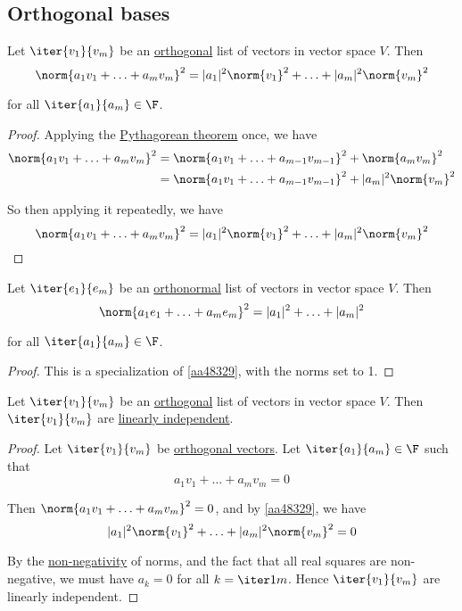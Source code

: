 \subsection{Orthogonal bases}\label{b926854}

\label{aa48329}

Let $\iter{v_1}{v_m}$ be an \href{d9735e5}{orthogonal} list of vectors in
vector space $V$. Then
$$
  \norm{a_1v_1+\ldots+a_mv_m}^2=|a_1|^2\norm{v_1}^2+\ldots+|a_m|^2\norm{v_m}^2
$$

for all $\iter{a_1}{a_m}\in\F$.

\begin{proof}
  Applying the \href{c5e5d7d}{Pythagorean theorem} once, we have
  \begin{align*}
    \norm{a_1v_1+\ldots+a_mv_m}^2 &=\norm{a_1v_1+\ldots+a_{m-1}v_{m-1}}^2+\norm{a_mv_m}^2     \\
                                  &=\norm{a_1v_1+\ldots+a_{m-1}v_{m-1}}^2+|a_m|^2\norm{v_m}^2
  \end{align*}

  So then applying it repeatedly, we have
  $$
    \norm{a_1v_1+\ldots+a_mv_m}^2=|a_1|^2\norm{v_1}^2+\ldots+|a_m|^2\norm{v_m}^2
  $$
\end{proof}

\label{a3a166f}

Let $\iter{e_1}{e_m}$ be an \href{d90fcb1}{orthonormal} list of vectors in
vector space $V$. Then
$$
  \norm{a_1e_1+\ldots+a_me_m}^2=|a_1|^2+\ldots+|a_m|^2
$$

for all $\iter{a_1}{a_m}\in\F$.

\begin{proof}
  This is a specialization of \autoref{aa48329}, with the norms set to 1.
\end{proof}

\label{c0eb6f5}

Let $\iter{v_1}{v_m}$ be an \href{d9735e5}{orthogonal} list of vectors in
vector space $V$. Then $\iter{v_1}{v_m}$ are \href{c133a44}{linearly
independent}.

\begin{proof}
  Let $\iter{v_1}{v_m}$ be \href{d9735e5}{orthogonal vectors}. Let
  $\iter{a_1}{a_m}\in\F$ such that
  $$
    a_1v_1+\ldots+a_mv_m=0
  $$

  Then $\norm{a_1v_1+\ldots+a_mv_m}^2=0$, and by \autoref{aa48329}, we have
  $$
    |a_1|^2\norm{v_1}^2+\ldots+|a_m|^2\norm{v_m}^2=0
  $$

  By the \href{e0fff96}{non-negativity} of norms, and the fact that all real
  squares are non-negative, we must have $a_k=0$ for all $k=\iter1m$. Hence
  $\iter{v_1}{v_m}$ are linearly independent.
\end{proof}

